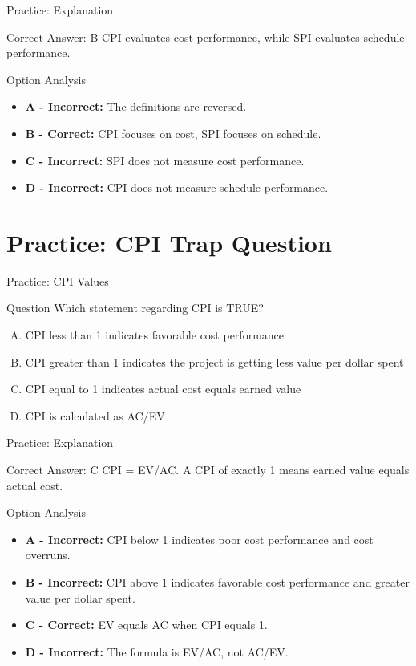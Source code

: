 \documentclass{beamer}
\begin{document}
	\begin{frame}{Practice: Explanation}
		\begin{block}{Correct Answer: B}
			CPI evaluates cost performance, while SPI evaluates schedule performance.
		\end{block}
		\begin{block}{Option Analysis}
			\begin{itemize}
				\item \textbf{A - Incorrect:} The definitions are reversed.
				\item \textbf{B - Correct:} CPI focuses on cost, SPI focuses on schedule.
				\item \textbf{C - Incorrect:} SPI does not measure cost performance.
				\item \textbf{D - Incorrect:} CPI does not measure schedule performance.
			\end{itemize}
		\end{block}
	\end{frame}
	
	\section{Practice: CPI Trap Question}
	
	\begin{frame}{Practice: CPI Values}
		\begin{block}{Question}
			Which statement regarding CPI is TRUE?
		\end{block}
		\begin{enumerate}[(A)]
			\item CPI less than 1 indicates favorable cost performance
			\item CPI greater than 1 indicates the project is getting less value per dollar spent
			\item CPI equal to 1 indicates actual cost equals earned value
			\item CPI is calculated as AC/EV
		\end{enumerate}
	\end{frame}
	
	\begin{frame}{Practice: Explanation}
		\begin{block}{Correct Answer: C}
			CPI = EV/AC. A CPI of exactly 1 means earned value equals actual cost.
		\end{block}
		\begin{block}{Option Analysis}
			\begin{itemize}
				\item \textbf{A - Incorrect:} CPI below 1 indicates poor cost performance and cost overruns.
				\item \textbf{B - Incorrect:} CPI above 1 indicates favorable cost performance and greater value per dollar spent.
				\item \textbf{C - Correct:} EV equals AC when CPI equals 1.
				\item \textbf{D - Incorrect:} The formula is EV/AC, not AC/EV.
			\end{itemize}
		\end{block}
	\end{frame}
	
\end{document}
